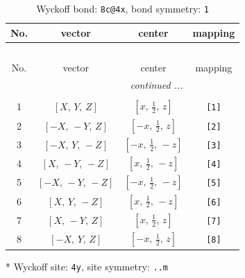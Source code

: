 \documentclass[fleqn,8pt]{jsarticle}
\begin{document}
\renewcommand{\arraystretch}{1.2}
\begin{longtable}{cccc}
\caption{Wyckoff bond: {\tt 8c@4x}, bond symmetry: {\tt 1}}
 \\
 \hline \hline
No. & vector & center & mapping \\ \hline \endfirsthead

\multicolumn{3}{l}{\tablename\ \thetable{}} \\
 \hline \hline
No. & vector & center & mapping \\ \hline \endhead

 \hline \hline
\multicolumn{3}{r}{\footnotesize\it continued ...} \\ \endfoot

 \hline \hline
\multicolumn{3}{r}{} \\ \endlastfoot

1 & $\left[ X,\, Y,\, Z \right]$ & $\left[ x,\, \frac{1}{2},\, z \right]$ & {\tt [1]} \\ \hline
2 & $\left[ - X,\, - Y,\, Z \right]$ & $\left[ - x,\, \frac{1}{2},\, z \right]$ & {\tt [2]} \\ \hline
3 & $\left[ - X,\, Y,\, - Z \right]$ & $\left[ - x,\, \frac{1}{2},\, - z \right]$ & {\tt [3]} \\ \hline
4 & $\left[ X,\, - Y,\, - Z \right]$ & $\left[ x,\, \frac{1}{2},\, - z \right]$ & {\tt [4]} \\ \hline
5 & $\left[ - X,\, - Y,\, - Z \right]$ & $\left[ - x,\, \frac{1}{2},\, - z \right]$ & {\tt [5]} \\ \hline
6 & $\left[ X,\, Y,\, - Z \right]$ & $\left[ x,\, \frac{1}{2},\, - z \right]$ & {\tt [6]} \\ \hline
7 & $\left[ X,\, - Y,\, Z \right]$ & $\left[ x,\, \frac{1}{2},\, z \right]$ & {\tt [7]} \\ \hline
8 & $\left[ - X,\, Y,\, Z \right]$ & $\left[ - x,\, \frac{1}{2},\, z \right]$ & {\tt [8]} \\
\end{longtable}
* Wyckoff site: {\tt 4y}, site symmetry: {\tt ..m}
\renewcommand{\arraystretch}{1.2}
\end{document}
